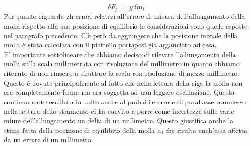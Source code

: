 \begin{equation*}
	\delta F_{p}\, =\, g\,\delta m_i
\end{equation*}
Per quanto riguarda gli errori relativi all'errore di misura dell'allungamento della molla rispetto alla sua posizione di equilibrio le considerazioni sono quelle esposte nel paragrafo precedente. C'è però da aggiungere che la posizione iniziale della molla è stata calcolata con il piattello portapesi già agganciato ad essa.\\
E' importante sottolineare che abbiamo deciso di rilevare l'allungamento della molla sulla scala millimetrata con risoluzione del millimetro in quanto abbiamo ritenuto di non riuscire a sfruttare la scala con risoluzione di mezzo millimetro. Questo è dovuto principalmente al fatto che nella lettura della riga la molla non era completamente ferma ma era soggetta ad uan leggere oscillazione. Questa continuo moto oscillatorio unito anche al probabile errore di parallasse commesso nella lettura dello strumento ci ha convito a porre come incertezza sulle varie miure dell'allungamento un delta di un millimetro. Questo giustifica anche la stima fatta della posizione di equilibrio della molla $z_0$ che risulta anch'essa affetta da un errore di un millimetro.

